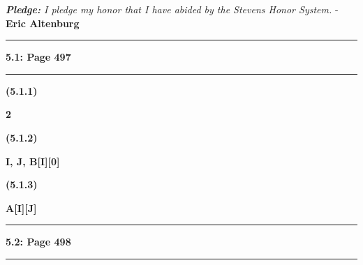 \documentclass[11pt]{article}
\newcommand\question[2]{\vspace{.25in}\hrule\textbf{#1: #2}\vspace{.5em}\hrule\vspace{.10in}}
\renewcommand\part[1]{\vspace{.10in}\textbf{(#1)}\par}
\begin{document}
\raggedright
\newcommand\NAME{Eric Altenburg}  %
\newcommand\COURSE{CS-383}
\newcommand\HWNUM{4}              %


\begin{center}
	\textit{\textbf{Pledge:} I pledge my honor that I have abided by the Stevens Honor System.} - \textbf{\NAME}
\end{center}


\question{5.1}{Page 497} %

	\part{5.1.1}
		\textbf{2}\par
	
	\part{5.1.2}
		\textbf{I, J, B[I][0]}\par
	
	\part{5.1.3}
		\textbf{A[I][J]}\par
	

\question{5.2}{Page 498} %
	
\end{document}
